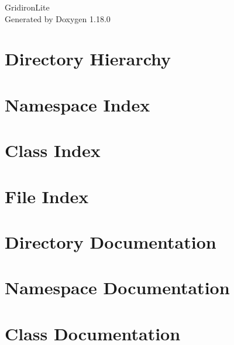 \documentclass[twoside]{book}
\newcommand{\+}{\discretionary{\mbox{\scriptsize$\hookleftarrow$}}{}{}}
\newcommand{\clearemptydoublepage}{%
    \newpage{\pagestyle{empty}\cleardoublepage}%
  }
\begin{document}
  \raggedbottom
    \hypersetup{pageanchor=false,
                bookmarksnumbered=true,
                pdfencoding=unicode
               }
  \begin{titlepage}
  \vspace*{7cm}
  \begin{center}%
  {\Large Gridiron\+Lite}\\
  \vspace*{1cm}
  {\large Generated by Doxygen 1.18.0}\\
  \end{center}
  \end{titlepage}
  \clearemptydoublepage
  \tableofcontents
  \clearemptydoublepage
  \hypersetup{pageanchor=true}
\chapter{Directory Hierarchy}

\chapter{Namespace Index}

\chapter{Class Index}

\chapter{File Index}

\chapter{Directory Documentation}


\chapter{Namespace Documentation}

\chapter{Class Documentation}










\end{document}
